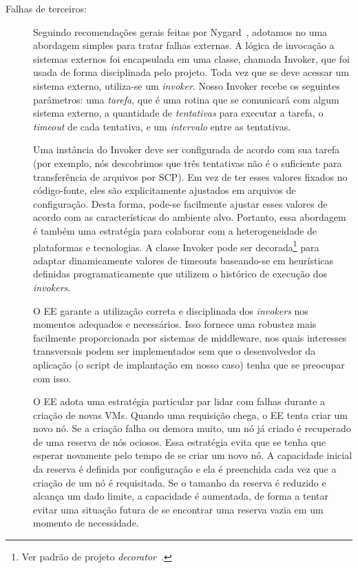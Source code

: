 \begin{description}
\item [Falhas de terceiros:]

Seguindo recomendações gerais feitas por Nygard~\cite{Nygard2009Release},
adotamos no \ee uma abordagem simples para tratar falhas externas.
A lógica de invocação a sistemas externos foi encapsulada em uma classe, 
chamada \textsf{Invoker}, que foi usada de forma disciplinada pelo projeto.
Toda vez que se deve acessar um sistema externo, utiliza-se um \emph{invoker}.
Nosso \textsf{Invoker} recebe os seguintes parâmetros:
uma \emph{tarefa}, que é uma rotina que se comunicará com algum sistema externo,
a quantidade de \emph{tentativas} para executar a tarefa,
o \emph{timeout} de cada tentativa, e um \emph{intervalo} entre as tentativas.

Uma instância do \textsf{Invoker} deve ser configurada 
de acordo com sua tarefa (por exemplo, nós descobrimos que três tentativas
não é o suficiente para transferência de arquivos por SCP).
Em vez de ter esses valores fixados no código-fonte, eles são explicitamente
ajustados em arquivos de configuração.
Desta forma, pode-se facilmente ajustar esses valores de acordo com 
as características do ambiente alvo.
Portanto, essa abordagem é também uma estratégia para colaborar 
com a heterogeneidade de plataformas e tecnologias.
A classe \textsf{Invoker} pode ser decorada\footnote{Ver padrão de projeto \emph{decorator}~\cite{GoF1995Patterns}.} 
para adaptar dinamicamente valores de timeouts 
baseando-se em heurísticas definidas programaticamente 
que utilizem o histórico de execução dos \emph{invokers}.

O EE garante a utilização correta e disciplinada dos \emph{invokers} nos momentos adequados e necessários.
Isso fornece uma robustez mais facilmente proporcionada por sistemas de middleware,
nos quais interesses transversais podem ser implementados sem que o desenvolvedor da aplicação 
(o script de implantação em nosso caso) tenha que se preocupar com isso.

O EE adota uma estratégia particular par lidar com falhas durante a criação de novas VMs.
Quando uma requisição chega, o EE tenta criar um novo nó.
Se a criação falha ou demora muito, um nó já criado é recuperado de uma reserva de nós ociosos.
Essa estratégia evita que se tenha que esperar novamente pelo tempo de se criar um novo nó.
A capacidade inicial da reserva é definida por configuração
e ela é preenchida cada vez que a criação de um nó é requisitada.
Se o tamanho da reserva é reduzido e alcança um dado limite,
a capacidade é aumentada, de forma a tentar evitar uma situação futura
de se encontrar uma reserva vazia em um momento de necessidade.


\end{description}
